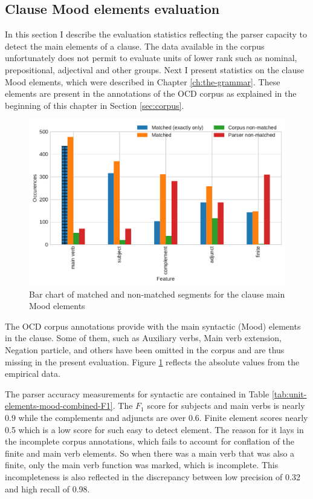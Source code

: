 \subsection{Clause Mood elements evaluation}
\label{sec:unit-mood-element-evaluation}

    In this section I describe the evaluation statistics reflecting the parser capacity to detect the main elements of a clause. The data available in the corpus unfortunately does not permit to evaluate units of lower rank such as nominal, prepositional, adjectival and other groups. Next I present statistics on the clause Mood elements, which were described in Chapter \ref{ch:the-grammar}. These elements are present in the annotations of the OCD corpus as explained in the beginning of this chapter in Section \ref{sec:corpus}. 
    
    \begin{figure}[!ht]
    \centering
    \includegraphics[width=.85\textwidth]{evaluation-results/figures/unit-elements-mood-data.pdf}
    \caption{Bar chart of matched and non-matched segments for the clause main Mood elements}
    \label{fig:unit-elements-mood-data}
    \end{figure}
    
    The OCD corpus annotations provide with the main syntactic (Mood) elements in the clause. Some of them, such as Auxiliary verbs, Main verb extension, Negation particle, and others have been omitted in the corpus and are thus missing in the present evaluation. Figure  \ref{fig:unit-elements-mood-data} reflects the absolute values from the empirical data. 
    
    The parser accuracy measurements for syntactic are contained in Table \ref{tab:unit-elements-mood-combined-F1}. The $F_1$ score for subjects and main verbs is nearly 0.9 while the complements and adjuncts are over 0.6. Finite element scores nearly 0.5 which is a low score for such easy to detect element. The reason for it lays in the incomplete corpus annotations, which fails to account for conflation of the finite and main verb elements. So when there was a main verb that was also a finite, only the main verb function was marked, which is incomplete. This incompleteness is also reflected in the discrepancy between low precision of 0.32 and high recall of 0.98. 
    
